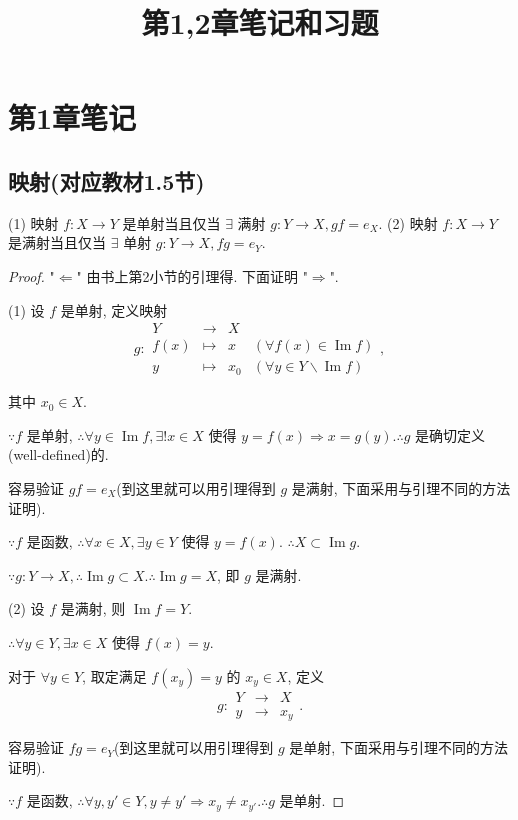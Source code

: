\documentclass{ctexart}
\title{第1,2章笔记和习题}
\begin{document}
\maketitle
\section{第1章笔记}
\subsection{映射(对应教材1.5节)}
\begin{theorem}
    (1) 映射 $f:X\to Y$ 是单射当且仅当 $\exists$ 满射 $g:Y\to X,gf=e_X$. (2) 映射 $f:X\to Y$ 是满射当且仅当 $\exists$ 单射 $g:Y\to X,fg=e_Y$.
\end{theorem}
\begin{proof}
    "$\Leftarrow$" 由书上第2小节的引理得. 下面证明 "$\Rightarrow$".

    (1) 设 $f$ 是单射, 定义映射
    \[g:\begin{array}{rcll}
    Y & \to & X \\
    f(x) & \mapsto & x & (\forall f(x)\in\operatorname{Im}f) \\
    y & \mapsto & x_0 & (\forall y\in Y\backslash\operatorname{Im}f)
    \end{array},\]

    其中 $x_0\in X$.

    $\because f$ 是单射, $\therefore\forall y\in\operatorname{Im}f,\exists!x\in X$ 使得 $y=f(x)\Rightarrow x=g(y).\therefore g$ 是确切定义(well-defined)的.

    容易验证 $gf=e_X$(到这里就可以用引理得到 $g$ 是满射, 下面采用与引理不同的方法证明).

    $\because f$ 是函数, $\therefore\forall x\in X,\exists y\in Y$ 使得 $y=f(x)$. $\therefore X\subset\operatorname{Im}g$.

    $\because g:Y\to X,\therefore\operatorname{Im}g\subset X.\therefore\operatorname{Im}g=X$, 即 $g$ 是满射.

    (2) 设 $f$ 是满射, 则 $\operatorname{Im}f=Y$.

    $\therefore\forall y\in Y,\exists x\in X$ 使得 $f(x)=y$.

    对于 $\forall y\in Y$, 取定满足 $f(x_y)=y$ 的 $x_y\in X$, 定义
    \[g:\begin{array}{rcl}
    Y & \to & X \\
    y & \to & x_y
    \end{array}.\]

    容易验证 $fg=e_Y$(到这里就可以用引理得到 $g$ 是单射, 下面采用与引理不同的方法证明).

    $\because f$ 是函数, $\therefore\forall y,y'\in Y,y\neq y'\Rightarrow x_y\neq x_{y'}.\therefore g$ 是单射.
\end{proof}
\end{document}
